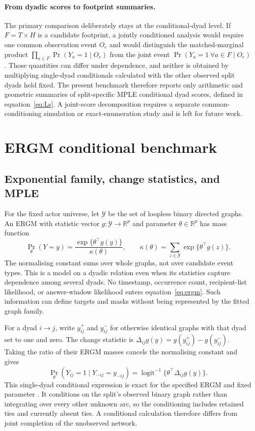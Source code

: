 \documentclass[10pt]{article}
\newcommand{\logitinv}{\operatorname{logit}^{-1}}
\begin{document}
\paragraph{From dyadic scores to footprint summaries.}
The primary comparison deliberately stays at the conditional-dyad level. If $F=T\times H$ is a candidate footprint, a jointly conditioned analysis would require one common observation event $O_e$ and would distinguish the matched-marginal product $\prod_{a\in F}\Pr(Y_a=1\mid O_e)$ from the joint event $\Pr(Y_a=1\ \forall a\in F\mid O_e)$. Those quantities can differ under dependence, and neither is obtained by multiplying single-dyad conditionals calculated with the other observed split dyads held fixed. The present benchmark therefore reports only arithmetic and geometric summaries of split-specific MPLE conditional dyad scores, defined in equation~\eqref{eq:Ls}. A joint-score decomposition requires a separate common-conditioning simulation or exact-enumeration study and is left for future work.

\section{ERGM conditional benchmark}
\subsection{Exponential family, change statistics, and MPLE}
For the fixed actor universe, let $\mathcal Y$ be the set of loopless binary directed graphs. An ERGM with statistic vector $g:\mathcal Y\to\mathbb R^p$ and parameter $\theta\in\mathbb R^p$ has mass function
\begin{equation}
\Pr_\theta(Y=y)=\frac{\exp\{\theta^\top g(y)\}}{\kappa(\theta)},\qquad
\kappa(\theta)=\sum_{z\in\mathcal Y}\exp\{\theta^\top g(z)\}.
\label{eq:ergm}
\end{equation}
The normalising constant sums over whole graphs, not over candidate event types. This is a model on a dyadic relation even when its statistics capture dependence among several dyads. No timestamp, occurrence count, recipient-list likelihood, or answer-window likelihood enters equation~\eqref{eq:ergm}. Such information can define targets and masks without being represented by the fitted graph family.

For a dyad $i\to j$, write $y_{ij}^+$ and $y_{ij}^-$ for otherwise identical graphs with that dyad set to one and zero. The change statistic is $\Delta_{ij}g(y)=g(y_{ij}^+)-g(y_{ij}^-)$. Taking the ratio of their ERGM masses cancels the normalising constant and gives
\begin{equation}
\Pr_\theta(Y_{ij}=1\mid Y_{-ij}=y_{-ij})
=\logitinv\{\theta^\top\Delta_{ij}g(y)\}.
\label{eq:conditional}
\end{equation}
This single-dyad conditional expression is exact for the specified ERGM and fixed parameter \citep{wassermanPattison1996,krivitskyEtAl2011}. It conditions on the split's observed binary graph rather than integrating over every other unknown arc, so the conditioning includes retained ties and currently absent ties. A conditional calculation therefore differs from joint completion of the unobserved network.
\end{document}
